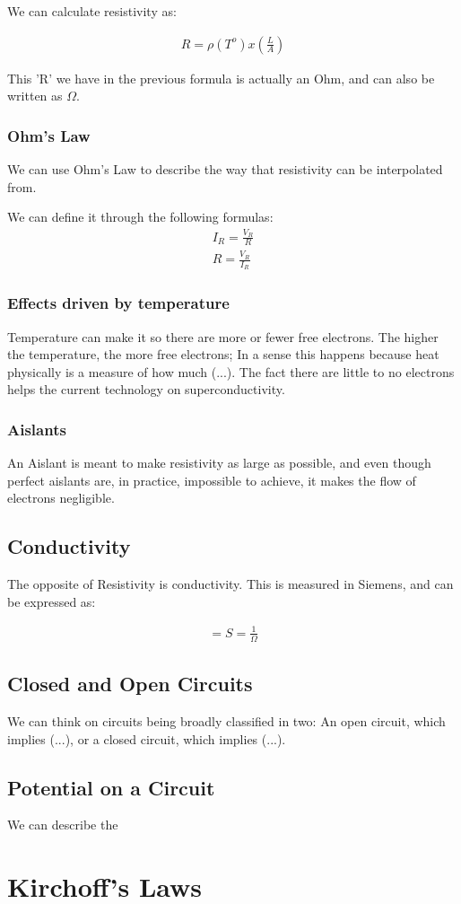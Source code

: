 \documentclass[11pt,fleqn]{book} %
\begin{document}
We can calculate resistivity as:

\begin{gather}
    R = \rho(T^o) x (\frac{L}{A})
\end{gather}

This 'R' we have in the previous formula is actually an Ohm, and can also be written as $\Omega$.

\subsection{Ohm's Law}

We can use Ohm's Law to describe the way that resistivity can be interpolated from.

We can define it through the following formulas:
\begin{gather}
    I_R = \frac{V_R}{R}\\
    R = \frac{V_R}{I_R}
\end{gather}

\subsection{Effects driven by temperature}

Temperature can make it so there are more or fewer free electrons. The higher the temperature, the more free electrons;
In a sense this happens because heat physically is a measure of how much (...). The fact there are little to no electrons helps 
the current technology on superconductivity.   

\subsection{Aislants}

An Aislant is meant to make resistivity as large as possible, and even though perfect aislants are, in practice, impossible to achieve,
it makes the flow of electrons negligible. 

\section{Conductivity}

The opposite of Resistivity is conductivity. This is measured in Siemens, and can be expressed as:

\begin{gather}
    [G] = S = \frac{1}{\Omega}
\end{gather}

\section{Closed and Open Circuits}

We can think on circuits being broadly classified in two: An open circuit, which implies (...), or a closed circuit, which
implies (...).
\section{Potential on a Circuit}


We can describe the 

\chapter{Kirchoff's Laws}
\end{document}
